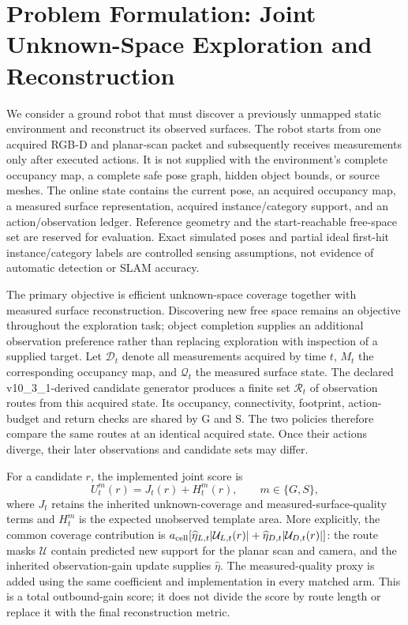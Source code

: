 \section{Problem Formulation: Joint Unknown-Space Exploration and Reconstruction}
\label{problem-formulation}

We consider a ground robot that must discover a previously unmapped static environment and reconstruct its observed surfaces. The robot starts from one acquired RGB-D and planar-scan packet and subsequently receives measurements only after executed actions. It is not supplied with the environment's complete occupancy map, a complete safe pose graph, hidden object bounds, or source meshes. The online state contains the current pose, an acquired occupancy map, a measured surface representation, acquired instance/category support, and an action/observation ledger. Reference geometry and the start-reachable free-space set are reserved for evaluation. Exact simulated poses and partial ideal first-hit instance/category labels are controlled sensing assumptions, not evidence of automatic detection or SLAM accuracy.

The primary objective is efficient unknown-space coverage together with measured surface reconstruction. Discovering new free space remains an objective throughout the exploration task; object completion supplies an additional observation preference rather than replacing exploration with inspection of a supplied target. Let $\mathcal D_t$ denote all measurements acquired by time $t$, $M_t$ the corresponding occupancy map, and $\mathcal Q_t$ the measured surface state. The declared v10\_3\_1-derived candidate generator produces a finite set $\mathcal R_t$ of observation routes from this acquired state. Its occupancy, connectivity, footprint, action-budget and return checks are shared by G and S. The two policies therefore compare the same routes at an identical acquired state. Once their actions diverge, their later observations and candidate sets may differ.

For a candidate $r$, the implemented joint score is
\begin{equation}
U_t^m(r)=J_t(r)+H_t^m(r),\qquad m\in\{G,S\},
\end{equation}
where $J_t$ retains the inherited unknown-coverage and measured-surface-quality terms and $H_t^m$ is the expected unobserved template area. More explicitly, the common coverage contribution is $a_{\rm cell}[\widehat\eta_{L,t}|\mathcal U_{L,t}(r)|+\widehat\eta_{D,t}|\mathcal U_{D,t}(r)|]$: the route masks $\mathcal U$ contain predicted new support for the planar scan and camera, and the inherited observation-gain update supplies $\widehat\eta$. The measured-quality proxy is added using the same coefficient and implementation in every matched arm. This is a total outbound-gain score; it does not divide the score by route length or replace it with the final reconstruction metric.

